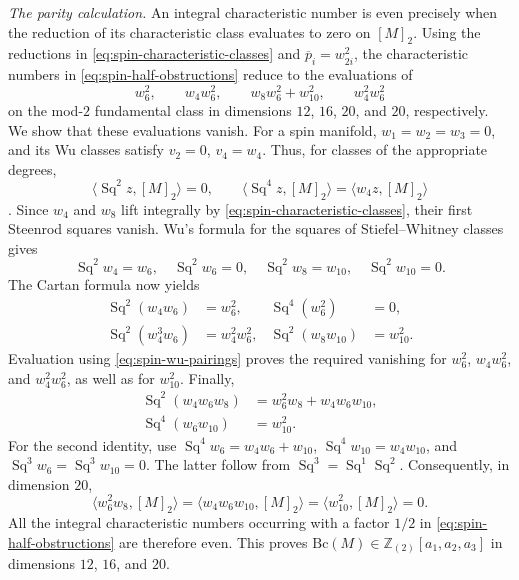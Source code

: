 \documentclass[14pt,dvipsnames]{extarticle}
\makeatletter
\numberwithin{equation}{subsection}
\theoremstyle{plain}
\theoremstyle{definition}
\theoremstyle{definition}
\renewenvironment{proof}[1][\proofname]{
 \par\pushQED{\qed}\normalfont
 \topsep6\p@\@plus6\p@\relax
 \trivlist\item[\hskip\labelsep\bfseries\itshape #1\@addpunct{.}]
}{\popQED\endtrivlist\@endpefalse}
\newcommand{\Bc}{\mathrm{Bc}}
\newcommand{\Ztwo}{\mathbb{Z}_{(2)}}
\makeatother
\begin{document}
\begin{proof}[Proof of \cref{thm:bc-spin-below24}]
\emph{The parity calculation.}
An integral characteristic number is even precisely when the reduction
of its characteristic class evaluates to zero on $[M]_2$. Using the
reductions in \eqref{eq:spin-characteristic-classes} and
$\overline p_i=w_{2i}^2$, the characteristic numbers in
\eqref{eq:spin-half-obstructions} reduce to the evaluations of
\[
 w_6^2,\qquad w_4w_6^2,\qquad
 w_8w_6^2+w_{10}^2,\qquad w_4^2w_6^2
\]
on the mod-$2$ fundamental class in dimensions $12$, $16$, $20$, and $20$,
respectively. We show that these evaluations vanish.
For a spin manifold, $w_1=w_2=w_3=0$, and its Wu classes satisfy
$v_2=0$, $v_4=w_4$. Thus, for classes of the appropriate degrees,
\begin{equation}\label{eq:spin-wu-pairings}
 \langle\operatorname{Sq}^2z,[M]_2\rangle=0,\qquad
 \langle\operatorname{Sq}^4z,[M]_2\rangle
 =\langle w_4z,[M]_2\rangle
\end{equation}
\cite[Theorem~11.14]{MS74}.
Since $w_4$ and $w_8$ lift integrally by
\eqref{eq:spin-characteristic-classes}, their first Steenrod squares vanish.
Wu's formula for the squares of Stiefel--Whitney classes
\cite[Problem~8-A]{MS74} gives
\[
 \operatorname{Sq}^2w_4=w_6,\quad
 \operatorname{Sq}^2w_6=0,\quad
 \operatorname{Sq}^2w_8=w_{10},\quad
 \operatorname{Sq}^2w_{10}=0.
\]
The Cartan formula now yields
\[
\begin{aligned}
 \operatorname{Sq}^2(w_4w_6)&=w_6^2,&
 \operatorname{Sq}^4(w_6^2)&=0,\\
 \operatorname{Sq}^2(w_4^3w_6)&=w_4^2w_6^2,&
 \operatorname{Sq}^2(w_8w_{10})&=w_{10}^2.
\end{aligned}
\]
Evaluation using \eqref{eq:spin-wu-pairings} proves the required vanishing
for $w_6^2$, $w_4w_6^2$, and $w_4^2w_6^2$, as well as for $w_{10}^2$.
Finally,
\[
\begin{aligned}
 \operatorname{Sq}^2(w_4w_6w_8)&=w_6^2w_8+w_4w_6w_{10},\\
 \operatorname{Sq}^4(w_6w_{10})&=w_{10}^2.
\end{aligned}
\]
For the second identity, use
$\operatorname{Sq}^4w_6=w_4w_6+w_{10}$,
$\operatorname{Sq}^4w_{10}=w_4w_{10}$, and
$\operatorname{Sq}^3w_6=\operatorname{Sq}^3w_{10}=0$. The latter follow
from $\operatorname{Sq}^3=\operatorname{Sq}^1\operatorname{Sq}^2$.
Consequently, in dimension $20$,
\[
 \langle w_6^2w_8,[M]_2\rangle
 =\langle w_4w_6w_{10},[M]_2\rangle
 =\langle w_{10}^2,[M]_2\rangle=0.
\]
All the integral characteristic numbers occurring with a factor $1/2$ in
\eqref{eq:spin-half-obstructions} are therefore even. This proves
$\Bc(M)\in\Ztwo[a_1,a_2,a_3]$ in dimensions $12$, $16$, and $20$.

\end{proof}
\end{document}
